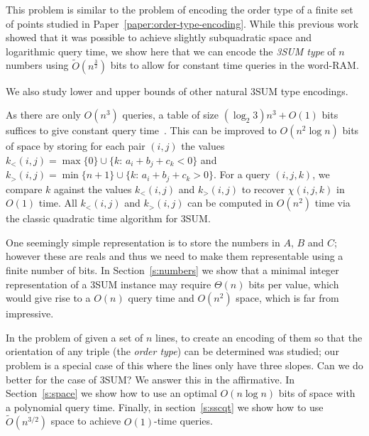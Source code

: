 This problem is similar to the problem of encoding the order
type of a finite set of points studied in Paper~\ref{paper:order-type-encoding}.
While this previous work showed that it was
possible to achieve slightly subquadratic space and logarithmic query time, we
show here that we can encode the \emph{3SUM type} of \(n\) numbers using
\(\tilde{O}(n^{\frac 32})\) bits to allow for constant time queries in the
word-RAM.

We also study lower and upper bounds of other natural 3SUM type encodings.

As there are only $O(n^3)$ queries, a table
of size $(\log_2 3) n^3 + O(1)$ bits suffices to give constant query time~\cite{DPT10}.
%
This can be improved to $O(n^2\log n)$ bits of space by
storing for each pair $(i,j)$ the values
\(k_<(i,j) = \max \{ 0\}\cup \{k \colon\, a_i + b_j + c_k < 0\}\) and
\(k_>(i,j) = \min \{ n+1\}\cup \{k \colon\, a_i + b_j + c_k > 0\}\).
For a query \((i,j,k)\), we compare \(k\) against the values \(k_<(i,j)\) and \(k_>(i,j)\)
to recover \(\chi(i,j,k)\) in \(O(1)\) time. All \(k_<(i,j)\) and \(k_>(i,j)\)
can be computed in \(O(n^2)\) time via the classic quadratic time algorithm for
3SUM.

One seemingly simple representation is to store the numbers in $A$, $B$ and
$C$; however these are reals and thus we need to make them representable using
a finite number of bits.
In Section~\ref{s:numbers} we show that a minimal integer representation of a
3SUM instance may require $\Theta(n)$ bits per value, which would give
rise to a $O(n)$ query time and $O(n^2)$ space, which is far from
impressive.
%


In \cite{CCILO18} the problem of given a set of $n$ lines, to create an
encoding of them so that the orientation of any triple (the \emph{order type})
can be determined was studied; our problem is a special case of this where the
lines only have three slopes.
Can we do better for the case of 3SUM? We answer this in the affirmative.
In Section~\ref{s:space} we show how to use an optimal $O(n \log n)$ bits of
space with a polynomial query time. Finally, in section~\ref{s:sscqt} we show
how to use $\tilde{O}(n^{3/2})$ space to achieve $O(1)$-time queries.



